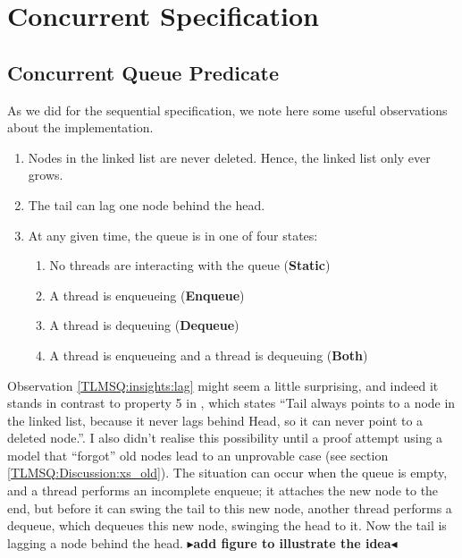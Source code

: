 \documentclass[a4paper, 10pt]{report}
\theoremstyle{definition}
\newcommand{\StaticState}{\textbf{Static}\xspace}
\newcommand{\EnqueueState}{\textbf{Enqueue}\xspace}
\newcommand{\DequeueState}{\textbf{Dequeue}\xspace}
\newcommand{\BothState}{\textbf{Both}\xspace}
\newcommand{\todo}[1]{{\color[rgb]{.5,0,0}\textbf{$\blacktriangleright$#1$\blacktriangleleft$}}}
\begin{document}
\section{Concurrent Specification}
\label{TLMSQSPECS:section:concurrent}

\subsection{Concurrent Queue Predicate}
\label{TLMSQSPECS:concurrent:sub:conc-queue-pred}

As we did for the sequential specification, we note here some useful observations about the implementation.
\begin{enumerate}
  \item\label{TLMSQ:insights:oldnodes} Nodes in the linked list are never deleted. Hence, the linked list only ever grows.
  \item\label{TLMSQ:insights:lag} The tail can lag one node behind the head.
  \item\label{TLMSQ:insights:states} At any given time, the queue is in one of four states:
    \begin{enumerate}
      \item\label{TLMSQ:insights:state:static} No threads are interacting with the queue (\StaticState)
      \item\label{TLMSQ:insights:state:enqueue} A thread is enqueueing (\EnqueueState)
      \item\label{TLMSQ:insights:state:dequeue} A thread is dequeuing (\DequeueState)
      \item\label{TLMSQ:insights:state:both} A thread is enqueueing and a thread is dequeuing (\BothState)
    \end{enumerate}
\end{enumerate}

Observation \ref{TLMSQ:insights:lag} might seem a little surprising, and indeed it stands in contrast to property 5 in \citet{DBLP:conf/podc/MichaelS96}, which states \enquote{Tail always points to a node in the linked list, because it never lags behind Head, so it can never point to a deleted node.}. I also didn't realise this possibility until a proof attempt using a model that ``forgot'' old nodes lead to an unprovable case (see section \ref{TLMSQ:Discussion:xs_old}). The situation can occur when the queue is empty, and a thread performs an incomplete enqueue; it attaches the new node to the end, but before it can swing the tail to this new node, another thread performs a dequeue, which dequeues this new node, swinging the head to it. Now the tail is lagging a node behind the head. \todo{add figure to illustrate the idea}
\end{document}
